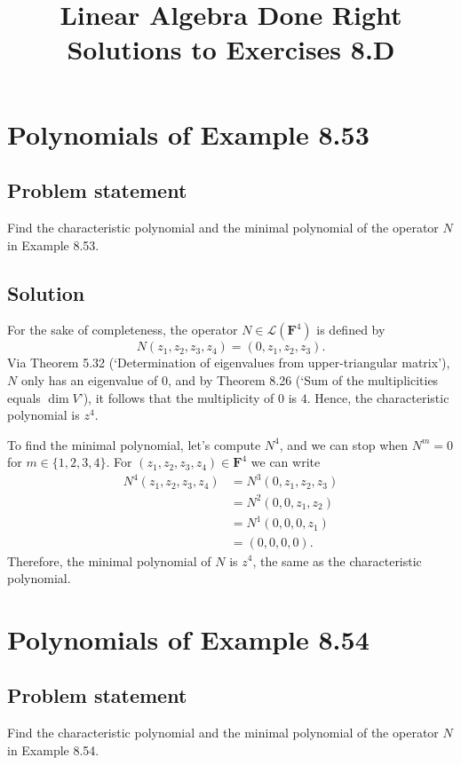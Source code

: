 \documentclass{article}
\title{Linear Algebra Done Right\\Solutions to Exercises 8.D}
\author{}
\date{}
\begin{document}
\maketitle

\section{Polynomials of Example 8.53}
\subsection*{Problem statement}
Find the characteristic polynomial and the minimal polynomial of the operator $N$ in Example 8.53.

\subsection*{Solution}
For the sake of completeness, the operator $N\in\mathcal{L}(\mathbf{F}^4)$ is defined by
\[N(z_1,z_2,z_3,z_4)=(0,z_1,z_2,z_3).\]
Via Theorem 5.32 (`Determination of eigenvalues from upper-triangular matrix'), $N$ only has an eigenvalue of $0$, and by Theorem 8.26 (`Sum of the multiplicities equals $\operatorname{dim}V$'), it follows that the multiplicity of $0$ is $4$. 
Hence, the characteristic polynomial is $z^4$.

To find the minimal polynomial, let's compute $N^4$, and we can stop when $N^m=0$ for $m\in\{1,2,3,4\}$. For $(z_1,z_2,z_3,z_4)\in\mathbf{F}^4$ we can write
\begin{align*}
    N^4(z_1,z_2,z_3,z_4)&=N^3(0,z_1,z_2,z_3)\\
    &=N^2(0,0,z_1,z_2)\\
    &=N^1(0,0,0,z_1)\\
    &=(0,0,0,0).
\end{align*}
Therefore, the minimal polynomial of $N$ is $z^4$, the same as the characteristic polynomial.

\clearpage

\section{Polynomials of Example 8.54}
\subsection*{Problem statement}
Find the characteristic polynomial and the minimal polynomial of the operator $N$ in Example 8.54.
\end{document}
